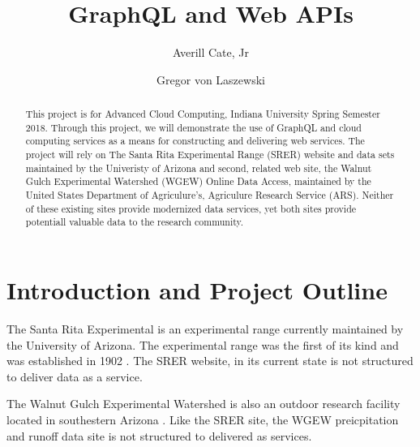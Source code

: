 
\title{GraphQL and Web APIs}

\author{Averill Cate, Jr}

\author{Gregor von Laszewski}

\renewcommand{\shortauthors}{G. v. Laszewski}

\begin{abstract}
This project is for Advanced Cloud Computing, Indiana University Spring 
Semester 2018.  Through this project, we will demonstrate the use of GraphQL \cite{hid505FacebookGraphQL2018}
and cloud computing services as a means for constructing and delivering web 
services.  The project will rely on The Santa Rita  Experimental Range (SRER) 
website and data sets maintained by the Univeristy of Arizona and second, 
related web site, the Walnut Gulch Experimental Watershed (WGEW) Online Data 
Access, maintained by the United States Department of Agriculure's, Agriculure 
Research Service (ARS).  Neither of these existing sites provide modernized 
data services, yet both sites provide potentiall valuable data to the research 
community.  

\end{abstract}


\maketitle

\section{Introduction and Project Outline}
The Santa Rita Experimental is an experimental range currently maintained by 
the University of Arizona.  The experimental range was the first of its kind 
and was established in 1902 \cite{SrerWebSite2018}.  The SRER website, in its 
current state is not structured to deliver data as a service.

The Walnut Gulch Experimental Watershed is also an outdoor research facility 
located in southestern Arizona \cite{WgewWebSite2018}.  Like the SRER site, 
the WGEW preicpitation and runoff data site is not structured to delivered as 
services.

